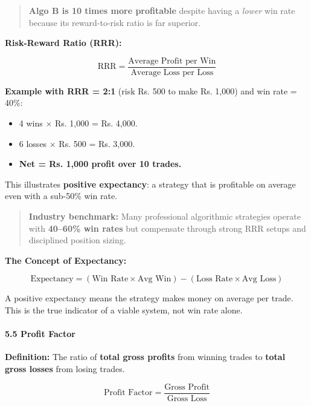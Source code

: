 \documentclass[12pt,openany]{book}
\begin{document}
\begin{quote}
    \textbf{Algo B is 10 times more profitable} despite having a \emph{lower} win rate because its reward-to-risk ratio is far superior.
\end{quote}

\textbf{Risk-Reward Ratio (RRR):}

\begin{equation*}
    \text{RRR} = \frac{\text{Average Profit per Win}}{\text{Average Loss per Loss}}
\end{equation*}

\textbf{Example with RRR = 2:1} (risk Rs. 500 to make Rs. 1,000) and win rate = 40\%:
\begin{itemize}[leftmargin=*]
    \item 4 wins $\times$ Rs. 1,000 = Rs. 4,000.
    \item 6 losses $\times$ Rs. 500 = Rs. 3,000.
    \item \textbf{Net = Rs. 1,000 profit over 10 trades.}
\end{itemize}

This illustrates \textbf{positive expectancy}: a strategy that is profitable on average even with a sub-50\% win rate.

\begin{quote}
    \textbf{Industry benchmark:} Many professional algorithmic strategies operate with \textbf{40--60\% win rates} but compensate through strong RRR setups and disciplined position sizing.
\end{quote}

\textbf{The Concept of Expectancy:}

\begin{equation*}
    \text{Expectancy} = (\text{Win Rate} \times \text{Avg Win}) - (\text{Loss Rate} \times \text{Avg Loss})
\end{equation*}

A positive expectancy means the strategy makes money on average per trade. This is the true indicator of a viable system, not win rate alone.

\paragraph{5.5 Profit Factor}

\textbf{Definition:} The ratio of \textbf{total gross profits} from winning trades to \textbf{total gross losses} from losing trades.

\begin{equation*}
    \text{Profit Factor} = \frac{\text{Gross Profit}}{\text{Gross Loss}}
\end{equation*}
\end{document}
